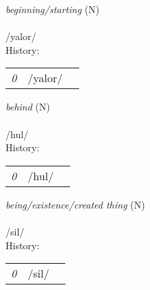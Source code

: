 \vspace{15pt}
\begin{nopagebreak}
 \textit{beginning/starting} (N)\\
\\
\noindent /y{\textprimstress}alor/\\


\noindent History:

\vspace{-0pt}
\hspace{40pt}
\begin{tabular}{ccc}
\textit{0} & /yalor/& \\
\end{tabular}

\vspace{20pt}\hline

\end{nopagebreak}
\filbreak



\vspace{15pt}
\begin{nopagebreak}
 \textit{behind} (N)\\
\\
\noindent /h{\textprimstress}ul/\\


\noindent History:

\vspace{-0pt}
\hspace{40pt}
\begin{tabular}{ccc}
\textit{0} & /hul/& \\
\end{tabular}

\vspace{20pt}\hline

\end{nopagebreak}
\filbreak



\vspace{15pt}
\begin{nopagebreak}
 \textit{being/existence/created thing} (N)\\
\\
\noindent /s{\textprimstress}il/\\


\noindent History:

\vspace{-0pt}
\hspace{40pt}
\begin{tabular}{ccc}
\textit{0} & /sil/& \\
\end{tabular}

\vspace{20pt}\hline

\end{nopagebreak}
\filbreak



